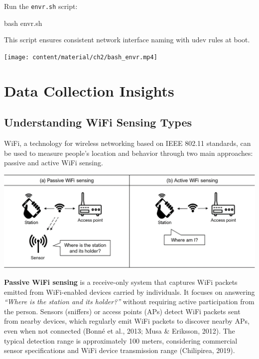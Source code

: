 \documentclass[
  letterpaper,
]{scrbook}
\newenvironment{Shaded}{\begin{snugshade}}{\end{snugshade}}
\newcommand{\FunctionTok}[1]{\textcolor[rgb]{0.28,0.35,0.67}{#1}}
\newcommand{\NormalTok}[1]{\textcolor[rgb]{0.00,0.23,0.31}{#1}}
\begin{document}
Run the \texttt{envr.sh} script:

\begin{Shaded}
\begin{Highlighting}[]
\FunctionTok{bash}\NormalTok{ envr.sh}
\end{Highlighting}
\end{Shaded}

This script ensures consistent network interface naming with udev rules
at boot.

\texttt{[image: content/material/ch2/bash\_envr.mp4]}

\chapter{Data Collection Insights}\label{data-collection-insights}

\section{Understanding WiFi Sensing
Types}\label{understanding-wifi-sensing-types}

WiFi, a technology for wireless networking based on IEEE 802.11
standards, can be used to measure people's location and behavior through
two main approaches: passive and active WiFi sensing.

\includegraphics{content/material/ch3/wifi-sensing-types.png}

\textbf{Passive WiFi sensing} is a receive-only system that captures
WiFi packets emitted from WiFi-enabled devices carried by individuals.
It focuses on answering \emph{``Where is the station and its holder?''}
without requiring active participation from the person. Sensors
(sniffers) or access points (APs) detect WiFi packets sent from nearby
devices, which regularly emit WiFi packets to discover nearby APs, even
when not connected (Bonné et al., 2013; Musa \& Eriksson, 2012). The
typical detection range is approximately 100 meters, considering
commercial sensor specifications and WiFi device transmission range
(Chilipirea, 2019).
\end{document}
